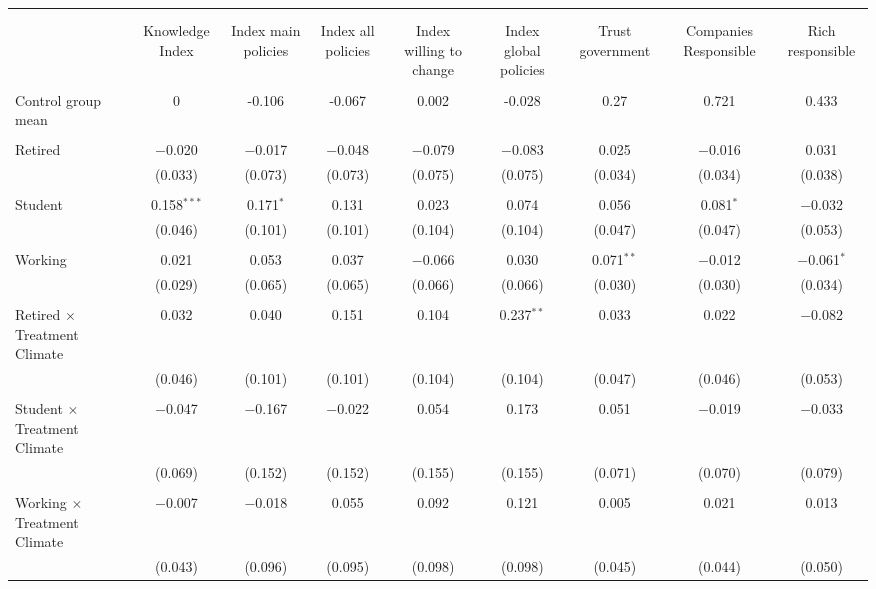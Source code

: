 
\begin{tabular}{@{\extracolsep{5pt}}lcccccccc} 
\\[-1.8ex]\hline 
\hline \\[-1.8ex] 
\\[-1.8ex] & Knowledge Index & Index main policies & Index all policies & Index willing to change & Index global policies & Trust government & Companies Responsible & Rich responsible \\ 
\hline \\[-1.8ex] 
 Control group mean & 0 & -0.106 & -0.067 & 0.002 & -0.028 & 0.27 & 0.721 & 0.433  \\ \hline \\[-1.8ex] Retired & $-$0.020 & $-$0.017 & $-$0.048 & $-$0.079 & $-$0.083 & 0.025 & $-$0.016 & 0.031 \\ 
  & (0.033) & (0.073) & (0.073) & (0.075) & (0.075) & (0.034) & (0.034) & (0.038) \\ 
  & & & & & & & & \\ 
 Student & 0.158$^{***}$ & 0.171$^{*}$ & 0.131 & 0.023 & 0.074 & 0.056 & 0.081$^{*}$ & $-$0.032 \\ 
  & (0.046) & (0.101) & (0.101) & (0.104) & (0.104) & (0.047) & (0.047) & (0.053) \\ 
  & & & & & & & & \\ 
 Working & 0.021 & 0.053 & 0.037 & $-$0.066 & 0.030 & 0.071$^{**}$ & $-$0.012 & $-$0.061$^{*}$ \\ 
  & (0.029) & (0.065) & (0.065) & (0.066) & (0.066) & (0.030) & (0.030) & (0.034) \\ 
  & & & & & & & & \\ 
 Retired $\times$ Treatment Climate & 0.032 & 0.040 & 0.151 & 0.104 & 0.237$^{**}$ & 0.033 & 0.022 & $-$0.082 \\ 
  & (0.046) & (0.101) & (0.101) & (0.104) & (0.104) & (0.047) & (0.046) & (0.053) \\ 
  & & & & & & & & \\ 
 Student $\times$ Treatment Climate & $-$0.047 & $-$0.167 & $-$0.022 & 0.054 & 0.173 & 0.051 & $-$0.019 & $-$0.033 \\ 
  & (0.069) & (0.152) & (0.152) & (0.155) & (0.155) & (0.071) & (0.070) & (0.079) \\ 
  & & & & & & & & \\ 
 Working $\times$ Treatment Climate & $-$0.007 & $-$0.018 & 0.055 & 0.092 & 0.121 & 0.005 & 0.021 & 0.013 \\ 
  & (0.043) & (0.096) & (0.095) & (0.098) & (0.098) & (0.045) & (0.044) & (0.050) \\ 

\end{tabular}
